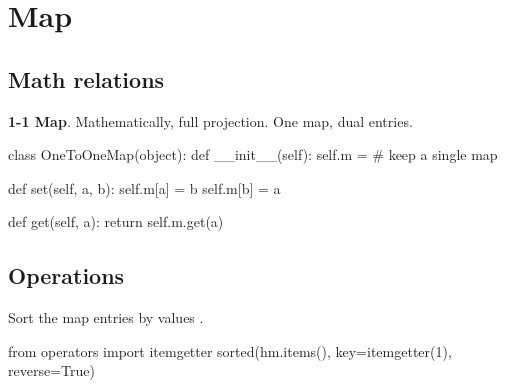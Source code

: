 \section{Map}
\subsection{Math relations}
\textbf{1-1 Map}. Mathematically, full projection. One map, dual entries.
\begin{python}
class OneToOneMap(object):
    def __init__(self):
        self.m = {}  # keep a single map

    def set(self, a, b):
        self.m[a] = b
        self.m[b] = a

    def get(self, a):
        return self.m.get(a)
\end{python}
\subsection{Operations}
 Sort the map entries by values .
\begin{python}
from operators import itemgetter 
sorted(hm.items(), key=itemgetter(1), reverse=True)
\end{python}
